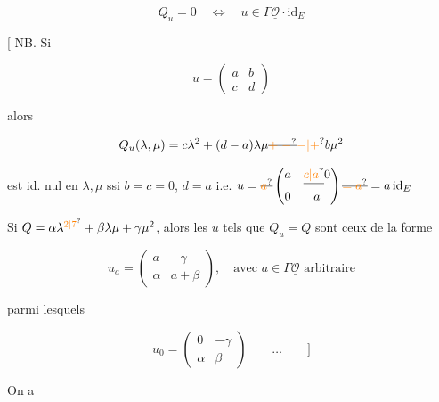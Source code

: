 \[
Q_u=0\quad\Longleftrightarrow\quad u\in\Gamma\underline{\mathcal O}\cdot\mathrm{id}_E
\]

[ NB. Si

\[
u=\begin{pmatrix}a&b\\c&d\end{pmatrix}
\]

alors

\[
Q_u(\lambda,\mu)=c\lambda^2+(d-a)\lambda\mu\deleted{\unsure{+|-}}\unsure{-|+}b\mu^2
\]

 est id. nul en $\lambda,\mu$ ssi $b=c=0$, $d=a$ i.e. $u=\deleted{\unsure{a}}\begin{pmatrix}a&\deleted{\unsure{c|a}}0\\0&a\end{pmatrix}\deleted{\unsure{=a}}=a\,\mathrm{id}_E$

Si $Q=\alpha\lambda^{\unsure{2|7}}+\beta\lambda\mu+\gamma\mu^2$, alors les $u$ tels que $Q_u=Q$ sont ceux de la forme

\[
u_a=\begin{pmatrix}a&-\gamma\\\alpha&a+\beta\end{pmatrix},\quad\text{avec }a\in\Gamma\underline{\mathcal O}\text{ arbitraire}
\]

parmi lesquels

\[
u_0=\begin{pmatrix}0&-\gamma\\\alpha&\beta\end{pmatrix}\qquad\ldots\qquad]
\]

On a 
